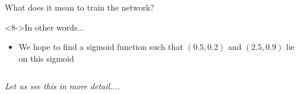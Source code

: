 \documentclass[serif, aspectratio=169]{beamer}
\begin{document}
\begin{frame}
\begin{columns}
\begin{overlayarea}{\textwidth}{\textheight}
{\begin{block}{What does it mean to train the network?}
\end{block}

\begin{block}<8->{In other words...}
\begin{itemize}\justifying
    \item We hope to find a sigmoid function such that $(0.5, 0.2)$ and $(2.5, 0.9)$ lie on this sigmoid
\end{itemize}
\end{block}

}
\end{overlayarea}
\end{columns}
\end{frame}

\begin{frame}
\fontsize{16pt}{7.2}\selectfont
 \textit{Let us see this in more detail....}
\end{frame}
\end{document}
